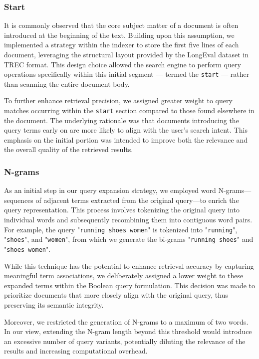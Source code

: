 \subsubsection{Start}
\label{subsubsec:Start}
It is commonly observed that the core subject matter of a document is often introduced at the beginning of the text. Building upon this assumption, we implemented a strategy within the indexer to store the first five lines of each document, leveraging the structural layout provided by the LongEval dataset in TREC format. This design choice allowed the search engine to perform query operations specifically within this initial segment — termed the \texttt{start} — rather than scanning the entire document body.

To further enhance retrieval precision, we assigned greater weight to query matches occurring within the \texttt{start} section compared to those found elsewhere in the document. The underlying rationale was that documents introducing the query terms early on are more likely to align with the user's search intent. This emphasis on the initial portion was intended to improve both the relevance and the overall quality of the retrieved results.

\subsubsection{N-grams}
\label{subsubsec:Start}
As an initial step in our query expansion strategy, we employed word N-grams—sequences of adjacent terms extracted from the original query—to enrich the query representation. This process involves tokenizing the original query into individual words and subsequently recombining them into contiguous word pairs. For example, the query "\texttt{running shoes women}" is tokenized into "\texttt{running}", "\texttt{shoes}", and "\texttt{women}", from which we generate the bi-grams "\texttt{running shoes}" and "\texttt{shoes women}".

While this technique has the potential to enhance retrieval accuracy by capturing meaningful term associations, we deliberately assigned a lower weight to these expanded terms within the Boolean query formulation. This decision was made to prioritize documents that more closely align with the original query, thus preserving its semantic integrity.

Moreover, we restricted the generation of N-grams to a maximum of two words. In our view, extending the N-gram length beyond this threshold would introduce an excessive number of query variants, potentially diluting the relevance of the results and increasing computational overhead.


